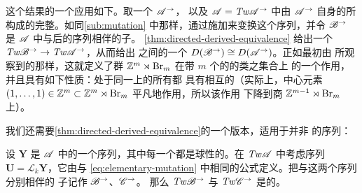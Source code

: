 这个结果的一个应用如下。取一个\trDirected\trACategory{} $\mathscr{A}^{\rightarrow}$，
以及 $\mathscr{A}=\mathit{Tw}\mathscr{A}^{\rightarrow}$ 中由 $\mathscr{A}^{\rightarrow}$
自身的\trObject{}所构成的完整\trExceptionalCollection。如同\cref{sub:mutation}
中那样，通过施加\trMutation{}来变换这个序列，并令 $\mathscr{B}^{\rightarrow}$ 是
$\mathscr{A}$ 中与\trMutation{}后的序列相伴的\trDirected{}子\trCategory。%
\cref{thm:directed-derived-equivalence} 给出一个\trQuasiequivalence{}%
$\mathit{Tw}\mathscr{B}^{\rightarrow}\to\mathit{Tw}\mathscr{A}^{\rightarrow}$，从而给出%
\trTriangulated{}\trCategory{}之间的一个\trEquivalence{}%
$D(\mathscr{B}^{\rightarrow})\cong D(\mathscr{A}^{\rightarrow})$。正如最初由%
\trKontsevich{}所观察到的那样，这就定义了群 $\mathbb{Z}^m\rtimes\mathrm{Br}_m$ 在带
$m$ 个\trObject{}的\trDirected\trACategory{}的\trQuasiisomorphism{}类之集合上
的一个作用，并且具有如下性质：处于同一\trTrajectory{}上的所有\trCategory{}都
具有相互\trEquivalence{}的\trDerivedCategory{}（实际上，中心元素
$(1,\ldots,1)\in\mathbb{Z}^m\subset\mathbb{Z}^m\rtimes\mathrm{Br}_m$ 平凡地作用，所以该作用
下降到商 $\mathbb{Z}^{m-1}\rtimes\mathrm{Br}_m$ 上）。

我们还需要\cref{thm:directed-derived-equivalence}的一个版本，适用于并非%
\trExceptionalCollection{}的序列：

\begin{lemma}\label{thm:spherical-mutation-directed}
设 $\mathbf{Y}$ 是 $\mathscr{A}$ 中\trObject{}的一个序列，其中每一个都是球性的。在
$\mathit{Tw}\mathscr{A}$ 中考虑序列 $\mathbf{U}=\mathscr{L}_k\mathbf{Y}$，它由与
\eqref{eq:elementary-mutation} 中相同的公式定义。把与这两个序列分别相伴的%
\trDirected{}子\trCategory{}记作 $\mathscr{B}^{\rightarrow}$、$\mathscr{C}^{\rightarrow}$。
那么 $\mathit{Tw}\mathscr{B}^{\rightarrow}$ 与 $\mathit{Tw}\mathscr{C}^{\rightarrow}$
是\trQuasiequivalence{}的。
\end{lemma}


